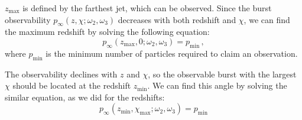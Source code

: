 \documentclass[manuscript]{aastex}
\begin{document}
$z_\text{max}$ is defined by the farthest jet, which can be
observed. Since the burst observability
$p_\infty\left(z,\chi;\omega_2,\omega_3\right)$ decreases with both
redshift and $\chi$, we can find the maximum redshift by solving the
following equation:
\begin{equation}
p_\infty\left(z_\text{max},0;\omega_2,\omega_3\right) = p_\text{min} \,,
\end{equation}
where $p_\text{min}$ is the minimum number of particles required to claim an observation.

The observability declines with $z$ and $\chi$, so the observable
burst with the largest $\chi$ should be located at the redshift
$z_\text{min}$. We can find this angle by solving the similar
equation, as we did for the redshifts:
\begin{equation}
  	p_\infty\left(z_\text{min},\chi_\text{max};\omega_2,\omega_3\right) = p_\text{min}
\end{equation}
\end{document}
